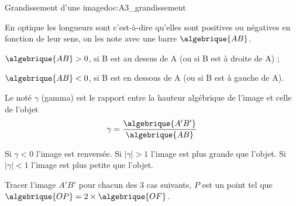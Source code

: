 \begin{doc}{Grandissement d'une image}{doc:A3_grandissement}
  
  \begin{importants}
    En optique les longueurs sont  c'est-à-dire qu'elles sont positives ou négatives en fonction de leur sens, on les note avec une barre $\algebrique{AB}$.
  \end{importants}
  \begin{listePoints}
    \item $\algebrique{AB} > 0$, si B est au dessus de A (ou si B est à droite de A) ;
    \item $\algebrique{AB} < 0$, si B est en dessous de A (ou si B est à gauche de A).
  \end{listePoints}
  
  \begin{importants}
    Le  noté $\gamma$ (gamma) est le rapport entre la hauteur algébrique de l'image et celle de l'objet
    \begin{equation*}
      \gamma = \dfrac{\algebrique{A'B'}}{\algebrique{AB}}
    \end{equation*}
  \end{importants}
  Si $\gamma < 0$ l'image est renversée.
  Si $|\gamma| > 1$ l'image est plus grande que l'objet. 
  Si $|\gamma| < 1$ l'image est plus petite que l'objet.
\end{doc}


\nomPrenomClasse

\numeroQuestion
Tracer l'image $A'B'$ pour chacun des 3 cas suivants, $P$ est un point tel que $\algebrique{OP} = 2 \times \algebrique{OF}$.

\begin{center}  
  \vspace*{24pt}
  
  \vspace*{24pt}
  
\end{center}




